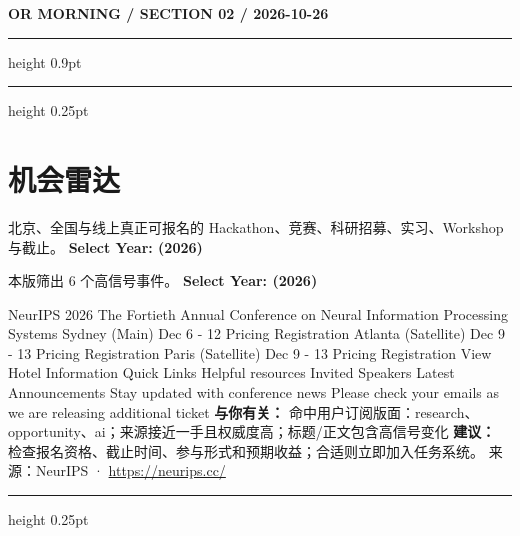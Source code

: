 \documentclass[10.5pt]{ctexart}
\begin{document}
\newpage
{\small\bfseries OR MORNING / SECTION 02 / 2026-10-26}
\vspace{2mm}
\hrule height 0.9pt
\vspace{1.5mm}
\hrule height 0.25pt
\vspace{4mm}
\section*{机会雷达}
{\color{ormuted} 北京、全国与线上真正可报名的 Hackathon、竞赛、科研招募、实习、Workshop 与截止。}
\vspace{2mm}
{\LARGE\bfseries Select Year: (2026)}\par
\vspace{1mm}
{\color{ormuted} 本版筛出 6 个高信号事件。}
\vspace{3mm}
{\Large\bfseries Select Year: (2026)}\par
NeurIPS 2026 The Fortieth Annual Conference on Neural Information Processing Systems Sydney (Main) Dec 6 - 12 Pricing Registration Atlanta (Satellite) Dec 9 - 13 Pricing Registration Paris (Satellite) Dec 9 - 13 Pricing Registration View Hotel Information Quick Links Helpful resources Invited Speakers Latest Announcements Stay updated with conference news Please check your emails as we are releasing additional ticket
\textbf{与你有关：} 命中用户订阅版面：research、opportunity、ai；来源接近一手且权威度高；标题/正文包含高信号变化
\textbf{建议：} 检查报名资格、截止时间、参与形式和预期收益；合适则立即加入任务系统。
{\footnotesize\color{ormuted} 来源：NeurIPS · \url{https://neurips.cc/}}
\vspace{4mm}
\hrule height 0.25pt
\vspace{3mm}
\end{document}
